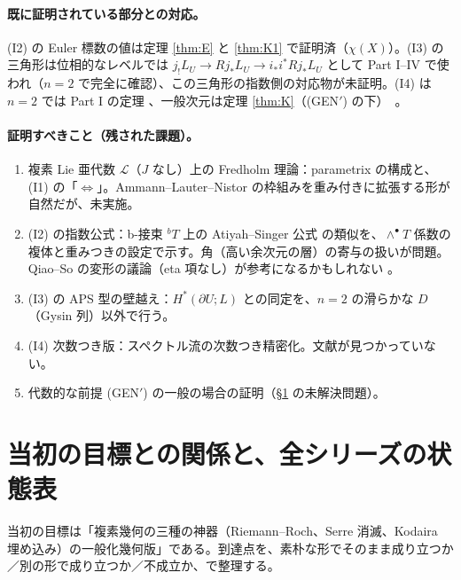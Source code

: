 \paragraph{既に証明されている部分との対応。}(I2) の Euler 標数の値は定理 \ref{thm:E} と \ref{thm:K1} で証明済（$\chi(X)$）。(I3) の三角形は位相的なレベルでは $j_!L_U\to Rj_*L_U\to i_*i^*Rj_*L_U$ として Part I--IV で使われ（$n=2$ で完全に確認）、この三角形の指数側の対応物が未証明。(I4) は $n=2$ では Part I の定理 \tP、一般次元は定理 \ref{thm:K}（(GEN$'$) の下）\tP\ \tQ。

\paragraph{証明すべきこと（残された課題）。}
\begin{enumerate}
\item 複素 Lie 亜代数 $\mathcal L$（$J$ なし）上の Fredholm 理論：parametrix の構成と、(I1) の「$\Leftrightarrow$」。Ammann--Lauter--Nistor の枠組みを重み付きに拡張する形が自然だが、未実施。
\item (I2) の指数公式：b-接束 $^bT$ 上の Atiyah--Singer 公式 \cite{BLS} の類似を、$\wedge^\bullet T$ 係数の複体と重みつきの設定で示す。角（高い余次元の層）の寄与の扱いが問題。Qiao--So の変形の議論（eta 項なし）が参考になるかもしれない \tQ。
\item (I3) の APS 型の壁越え：$H^*(\partial U;L)$ との同定を、$n=2$ の滑らかな $D$（Gysin 列）以外で行う。
\item (I4) 次数つき版：スペクトル流の次数つき精密化。文献が見つかっていない。
\item 代数的な前提 (GEN$'$) の一般の場合の証明（\S\ref{sec:ledger} の未解決問題）。
\end{enumerate}

\section{当初の目標との関係と、全シリーズの状態表}\label{sec:ledger}
当初の目標は「複素幾何の三種の神器（Riemann--Roch、Serre 消滅、Kodaira 埋め込み）の一般化幾何版」である。到達点を、素朴な形でそのまま成り立つか／別の形で成り立つか／不成立か、で整理する。

